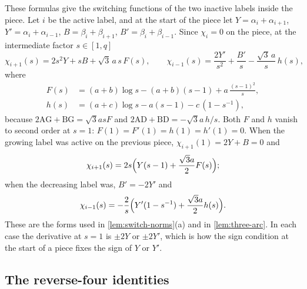 These formulas give the switching functions of the two inactive labels inside the piece. Let
$i$ be the active label, and at the start of the piece let $Y=\alpha_i+\alpha_{i+1}$,
$Y'=\alpha_i+\alpha_{i-1}$, $B=\beta_i+\beta_{i+1}$, $B'=\beta_i+\beta_{i-1}$. Since $\chi_i=0$ on
the piece, at the intermediate factor $s\in[1,q]$
\[
  \chi_{i+1}(s)=2s^2Y+sB+\sqrt3\,a\,s\,F(s),\qquad
  \chi_{i-1}(s)=\frac{2Y'}{s^2}+\frac{B'}{s}-\frac{\sqrt3\,a}{s}\,h(s),
\]
where
\begin{align*}
  F(s)&=(a+b)\log s-(a+b)(s-1)+a\,\frac{(s-1)^2}{s},\\
  h(s)&=(a+c)\log s-a(s-1)-c\,(1-s^{-1}),
\end{align*}
because $2\mathrm{AG}+\mathrm{BG}=\sqrt3asF$ and $2\mathrm{AD}+\mathrm{BD}=-\sqrt3a\,h/s$. Both $F$ and
$h$ vanish to second order at $s=1$: $F(1)=F'(1)=h(1)=h'(1)=0$. When the growing label was active
on the previous piece, $\chi_{i+1}(1)=2Y+B=0$ and
\[
  \chi_{i+1}(s)=2s\Bigl(Y(s-1)+\frac{\sqrt3a}{2}F(s)\Bigr);
\]
when the decreasing label was, $B'=-2Y'$ and
\[
  \chi_{i-1}(s)=-\frac2s\Bigl(Y'(1-s^{-1})+\frac{\sqrt3a}{2}h(s)\Bigr).
\]
These are the forms used in \cref{lem:switch-norms}(a) and in \cref{lem:three-arc}. In each case the derivative at $s=1$ is $\pm2Y$ or $\pm2Y'$, which is how
the sign condition at the start of a piece fixes the sign of $Y$ or $Y'$.

\subsection{The reverse-four identities}\label{app:rev-identities}

